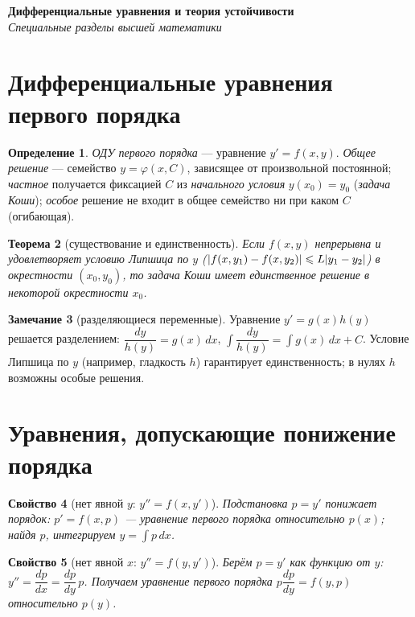 \documentclass[11pt,a4paper]{article}
\newcommand{\coursename}{Специальные разделы высшей математики}
\newcommand{\doctitle}{Дифференциальные уравнения и теория устойчивости}
\theoremstyle{definition}
\newtheorem{definition}{Определение}[section]
\newtheorem{remark}[definition]{Замечание}
\theoremstyle{plain}
\newtheorem{theorem}[definition]{Теорема}
\newtheorem{property}[definition]{Свойство}
\newcommand{\dx}{\,dx}
\renewcommand{\le}{\leqslant}
\DeclarePairedDelimiter{\abs}{\lvert}{\rvert}
\begin{document}
\begin{center}
  {\LARGE\bfseries \doctitle}\\[4pt]
  {\large\itshape \coursename}
\end{center}
\vspace{6pt}

\section{Дифференциальные уравнения первого порядка}

\begin{definition}
\emph{ОДУ первого порядка} — уравнение $y'=f(x,y)$. \emph{Общее решение} — семейство
$y=\varphi(x,C)$, зависящее от произвольной постоянной; \emph{частное} получается фиксацией $C$ из
\emph{начального условия} $y(x_0)=y_0$ (\emph{задача Коши}); \emph{особое} решение не входит в общее
семейство ни при каком $C$ (огибающая).
\end{definition}

\begin{theorem}[существование и единственность]
Если $f(x,y)$ непрерывна и удовлетворяет условию Липшица по $y$
($\abs{f(x,y_1)-f(x,y_2)}\le L\abs{y_1-y_2}$) в окрестности $(x_0,y_0)$, то задача Коши имеет
единственное решение в некоторой окрестности $x_0$.
\end{theorem}

\begin{remark}[разделяющиеся переменные]
Уравнение $y'=g(x)h(y)$ решается разделением: $\dfrac{dy}{h(y)}=g(x)\dx$, $\int\dfrac{dy}{h(y)}=\int g(x)\dx+C$.
Условие Липшица по $y$ (например, гладкость $h$) гарантирует единственность; в нулях $h$ возможны
особые решения.
\end{remark}

\section{Уравнения, допускающие понижение порядка}

\begin{property}[нет явной $y$: $y''=f(x,y')$]
Подстановка $p=y'$ понижает порядок: $p'=f(x,p)$ — уравнение первого порядка относительно $p(x)$;
найдя $p$, интегрируем $y=\int p\,dx$.
\end{property}

\begin{property}[нет явной $x$: $y''=f(y,y')$]
Берём $p=y'$ как функцию от $y$: $y''=\dfrac{dp}{dx}=\dfrac{dp}{dy}\,p$. Получаем уравнение первого
порядка $p\dfrac{dp}{dy}=f(y,p)$ относительно $p(y)$.
\end{property}
\end{document}
